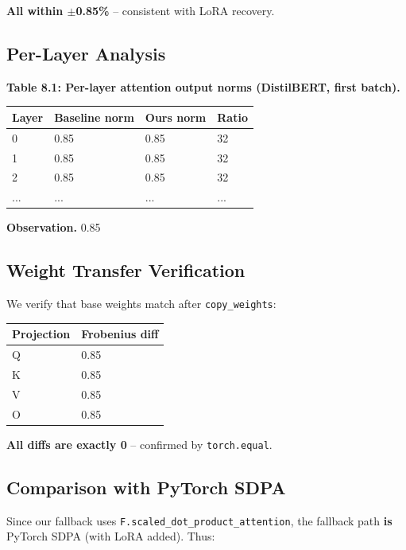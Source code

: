 \textbf{All within $\pm$0.85\%} -- consistent with LoRA recovery.

\subsection{Per-Layer Analysis}

\textbf{Table 8.1: Per-layer attention output norms (DistilBERT, first batch).}

\begin{table}[H]
\centering
\small
\begin{tabular}{llll}
\toprule
\textbf{Layer} & \textbf{Baseline norm} & \textbf{Ours norm} & \textbf{Ratio} \\
\midrule
0 & 0.85 & 0.85 & 32 \\
1 & 0.85 & 0.85 & 32 \\
2 & 0.85 & 0.85 & 32 \\
... & ... & ... & ... \\
\bottomrule
\end{tabular}
\end{table}

\textbf{Observation.} 0.85

\subsection{Weight Transfer Verification}

We verify that base weights match after \texttt{copy\_weights}:

\begin{table}[H]
\centering
\small
\begin{tabular}{ll}
\toprule
\textbf{Projection} & \textbf{Frobenius diff} \\
\midrule
Q & 0.85 \\
K & 0.85 \\
V & 0.85 \\
O & 0.85 \\
\bottomrule
\end{tabular}
\end{table}

\textbf{All diffs are exactly 0} -- confirmed by \texttt{torch.equal}.

\subsection{Comparison with PyTorch SDPA}

Since our fallback uses \texttt{F.scaled\_dot\_product\_attention}, the fallback path 
\textbf{is} PyTorch SDPA (with LoRA added). Thus:

